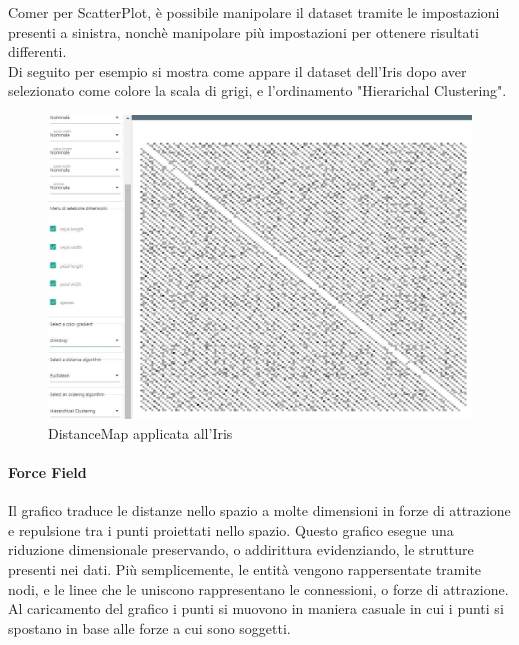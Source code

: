 \documentclass[../manuale_utente.tex]{subfiles}
\begin{document}
Comer per ScatterPlot, è possibile manipolare il dataset tramite le impostazioni presenti a sinistra, nonchè manipolare più impostazioni per ottenere risultati differenti.\\
Di seguito per esempio si mostra come appare il dataset dell'Iris dopo aver selezionato come colore la scala di grigi, e l'ordinamento "Hierarichal Clustering".


\begin{figure}[H]
	\centering
	\includegraphics[width=18cm]{img/dm/iris_clustering_euclideo_dm.jpg}
	\caption{DistanceMap applicata all'Iris}
\end{figure}


\paragraph{Force Field}
    \label{par:vis_force_field}
Il grafico  traduce le distanze nello spazio a molte dimensioni in forze di attrazione e repulsione tra i punti proiettati nello spazio. 
Questo grafico esegue una riduzione dimensionale preservando, o addirittura evidenziando, le strutture presenti nei dati. Più semplicemente, le entità vengono
rappersentate tramite nodi, e le linee che le uniscono rappresentano le connessioni, o forze di attrazione. Al caricamento del grafico i punti si muovono in maniera
casuale in cui i punti si spostano in base alle forze a cui sono soggetti. 
\end{document}
